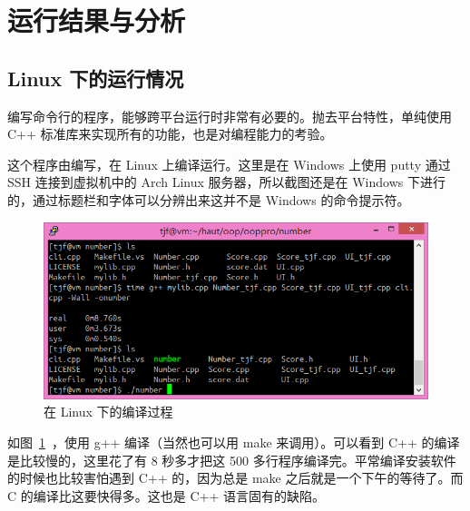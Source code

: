 \section{运行结果与分析}

\subsection{Linux 下的运行情况}

编写命令行的程序，能够跨平台运行时非常有必要的。抛去平台特性，单纯使用 C++ 标准库来实现所有的功能，也是对编程能力的考验。

这个程序由\tjf 编写，在 Linux 上编译运行。这里是在 Windows 上使用 putty 通过 SSH 连接到虚拟机中的 Arch Linux 服务器，所以截图还是在 Windows 下进行的，通过标题栏和字体可以分辨出来这并不是 Windows 的命令提示符。

\begin{figure}[htp]
\includegraphics[width=\textwidth]{image/tjf/compile.png}
\caption{\label{compile}在 Linux 下的编译过程}
\end{figure}

如图~\ref{compile}~，使用 g++ 编译（当然也可以用 make 来调用）。可以看到 C++ 的编译是比较慢的，这里花了有 8 秒多才把这 500 多行程序编译完。平常编译安装软件的时候也比较害怕遇到 C++ 的，因为总是 make 之后就是一个下午的等待了。而 C 的编译比这要快得多。这也是 C++ 语言固有的缺陷。



